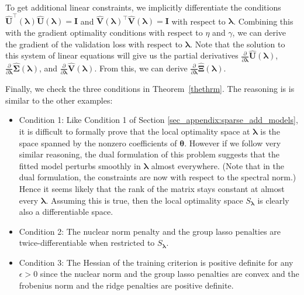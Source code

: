 \documentclass[12pt,letterpaper]{article}
\begin{document}
To get additional linear constraints, we implicitly differentiate the conditions $\boldsymbol{\hat U}^\top(\boldsymbol{\lambda}) \boldsymbol{\hat{U}}(\boldsymbol{\lambda}) = \boldsymbol{I}$ and $\boldsymbol{\hat{V}}(\boldsymbol{\lambda})^\top \boldsymbol{\hat{V}}(\boldsymbol{\lambda}) = \boldsymbol{I}$ with respect to $\boldsymbol{\lambda}$. Combining this with the gradient optimality conditions with respect to $\eta$ and $\gamma$, we can derive the gradient of the validation loss with respect to $\boldsymbol{\lambda}$. Note that the solution to this system of linear equations will give us the partial derivatives $\frac{\partial}{\partial \boldsymbol{\lambda}}\hat{\boldsymbol{U}}(\boldsymbol{\lambda})$, $\frac{\partial}{\partial \boldsymbol{\lambda}}\hat{\boldsymbol{\Sigma}}(\boldsymbol{\lambda})$, and $\frac{\partial}{\partial \boldsymbol{\lambda}}\hat{\boldsymbol{V}}(\boldsymbol{\lambda})$. From this, we can derive $\frac{\partial}{\partial \boldsymbol{\lambda}}\hat{\boldsymbol{\Xi}}(\boldsymbol{\lambda})$.

Finally, we check the three conditions in Theorem~\ref{thethrm}. The reasoning is is similar to the other examples:
\begin{itemize}
	\item[] Condition 1: Like Condition 1 of Section \ref{sec_appendix:sparse_add_models}, it is difficult to formally prove that the local optimality space at $\boldsymbol{\lambda}$ is the space spanned by the nonzero coefficients of $\boldsymbol{\theta}$. However if we follow very similar reasoning, the dual formulation of this problem suggests that the fitted model perturbs smoothly in $\boldsymbol{\lambda}$ almost everywhere. (Note that in the dual formulation, the constraints are now with respect to the spectral norm.) Hence it seems likely that the rank of the matrix stays constant at almost every $\boldsymbol{\lambda}$. Assuming this is true, then the local optimality space $S_{\boldsymbol{\lambda}}$ is clearly also a differentiable space.
	\item[] Condition 2: The nuclear norm penalty and the group lasso penalties are twice-differentiable when restricted to $S_{\boldsymbol{\lambda}}$.\hfill {}
	\item[] Condition 3: The Hessian of the training criterion is positive definite for any $\epsilon > 0$ since the nuclear norm and the group lasso penalties are convex and the frobenius norm and the ridge penalties are positive definite. \hfill {}
\end{itemize}
\end{document}
